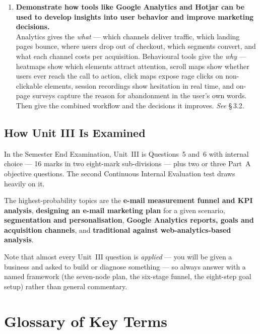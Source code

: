 \begin{enumerate}[leftmargin=2.2em,itemsep=1.4ex]
\item \textbf{Demonstrate how tools like Google Analytics and Hotjar can be used
      to develop insights into user behavior and improve marketing decisions.}
      \\
      Analytics gives the \emph{what} --- which channels deliver traffic, which
      landing pages bounce, where users drop out of checkout, which segments
      convert, and what each channel costs per acquisition. Behavioural tools
      give the \emph{why} --- heatmaps show which elements attract attention,
      scroll maps show whether users ever reach the call to action, click maps
      expose rage clicks on non-clickable elements, session recordings show
      hesitation in real time, and on-page surveys capture the reason for
      abandonment in the user's own words. Then give the combined workflow and
      the decisions it improves. \hfill\emph{See} \S\,3.2.

\end{enumerate}

\section*{How Unit III Is Examined}

\begin{keybox}
In the Semester End Examination, Unit~III is Questions~5 and~6 with internal
choice --- 16 marks in two eight-mark sub-divisions --- plus two or three Part~A
objective questions. The second Continuous Internal Evaluation test draws heavily
on it.

\smallskip
The highest-probability topics are the \textbf{e-mail measurement funnel and KPI
analysis}, \textbf{designing an e-mail marketing plan} for a given scenario,
\textbf{segmentation and personalisation}, \textbf{Google Analytics reports, goals
and acquisition channels}, and \textbf{traditional against web-analytics-based
analysis}.

\smallskip
Note that almost every Unit~III question is \emph{applied} --- you will be given a
business and asked to build or diagnose something --- so always answer with a
named framework (the seven-node plan, the six-stage funnel, the eight-step goal
setup) rather than general commentary.
\end{keybox}

\chapter{Glossary of Key Terms}

